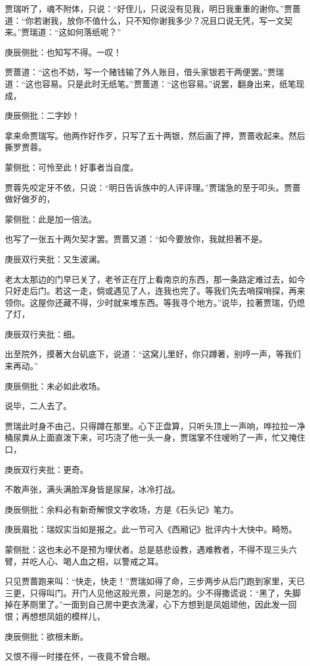 \begin{parag}


    贾瑞听了，魂不附体，只说：“好侄儿，只说没有见我，明日我重重的谢你。”贾蔷道：“你若谢我，放你不值什么，只不知你谢我多少？况且口说无凭，写一文契来。”贾瑞道：“这如何落纸呢？”\begin{note}庚辰侧批：也知写不得。一叹！\end{note}贾蔷道：“这也不妨，写一个赌钱输了外人账目，借头家银若干两便罢。”贾瑞道：“这也容易。只是此时无纸笔。”贾蔷道：“这也容易。”说罢，翻身出来，纸笔现成，\begin{note}庚辰侧批：二字妙！\end{note}拿来命贾瑞写。他两作好作歹，只写了五十两银，然后画了押，贾蔷收起来。然后撕罗贾蓉。\begin{note}蒙侧批：可怜至此！好事者当自度。\end{note}贾蓉先咬定牙不依，只说：“明日告诉族中的人评评理。”贾瑞急的至于叩头。贾蔷做好做歹的，\begin{note}蒙侧批：此是加一倍法。\end{note}也写了一张五十两欠契才罢。贾蔷又道：“如今要放你，我就担著不是。\begin{note}庚辰双行夹批：又生波澜。\end{note}老太太那边的门早已关了，老爷正在厅上看南京的东西，那一条路定难过去，如今只好走后门。若这一走，倘或遇见了人，连我也完了。等我们先去哨探哨探，再来领你。这屋你还藏不得，少时就来堆东西。等我寻个地方。”说毕，拉著贾瑞，仍熄了灯，\begin{note}庚辰双行夹批：细。\end{note}出至院外，摸著大台矶底下，说道：“这窝儿里好，你只蹲著，别哼一声，等我们来再动。”\begin{note}庚辰侧批：未必如此收场。\end{note}说毕，二人去了。
\end{parag}


\begin{parag}


    贾瑞此时身不由己，只得蹲在那里。心下正盘算，只听头顶上一声响，哗拉拉一净桶尿粪从上面直泼下来，可巧浇了他一头一身，贾瑞掌不住嗳哟了一声，忙又掩住口，\begin{note}庚辰双行夹批：更奇。\end{note}不敢声张，满头满脸浑身皆是尿屎，冰冷打战。\begin{note}庚辰侧批：余料必有新奇解恨文字收场，方是《石头记》笔力。\end{note}\begin{note}庚辰眉批：瑞奴实当如是报之。此一节可入《西厢记》批评内十大快中。畸笏。\end{note}\begin{note}蒙侧批：这也未必不是预为埋伏者。总是慈悲设教，遇难教者，不得不现三头六臂，并吃人心、喝人血之相，以警戒之耳。\end{note}只见贾蔷跑来叫：“快走，快走！”贾瑞如得了命，三步两步从后门跑到家里，天已三更，只得叫门。开门人见他这般光景，问是怎的。少不得撒谎说：“黑了，失脚掉在茅厕里了。”一面到自己房中更衣洗濯，心下方想到是凤姐顽他，因此发一回恨；再想想凤姐的模样儿，\begin{note}庚辰侧批：欲根未断。\end{note}又恨不得一时搂在怀，一夜竟不曾合眼。
\end{parag}


